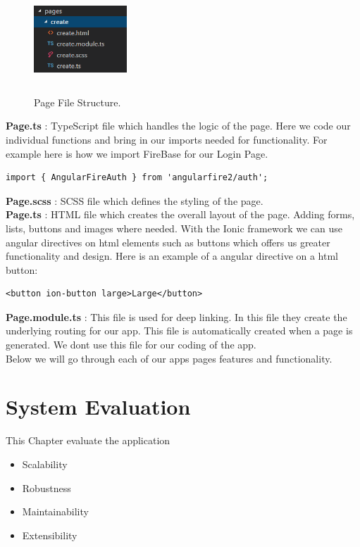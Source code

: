\begin{figure}[h]
\centering
\includegraphics[width=3.5cm, height=4cm]{img/Pages}
\caption{Page File Structure.}
\end{figure}

\noindent \textbf{Page.ts} : TypeScript file which handles the logic of the page. Here we code our individual functions and bring in our imports needed for functionality. For example here is how we import FireBase for our Login Page. 
    
\begin{verbatim}
import { AngularFireAuth } from 'angularfire2/auth';
\end{verbatim}

\noindent \textbf{Page.scss} : SCSS file which defines the styling of the page.\\

\noindent \textbf{Page.ts} : HTML file which creates the overall layout of the page. Adding forms, lists, buttons and images where needed. With the Ionic framework we can use angular directives on html elements such as buttons which offers us greater functionality and design. Here is an example of a angular directive on a html button:

\begin{verbatim}
<button ion-button large>Large</button>
\end{verbatim}

\noindent \textbf{Page.module.ts} : This file is used for deep linking. In this file they create the underlying routing for our app.\cite{https://ionicframework.com/docs/api/IonicPageModule/} This file is automatically created when a page is generated. We dont use this file for our coding of the app.\\

\noindent Below we will go through each of our apps pages features and functionality.


\chapter{System Evaluation}
This Chapter evaluate the application
\begin{itemize}
    \item Scalability
    \item Robustness
    \item Maintainability
    \item Extensibility
\end{itemize}

